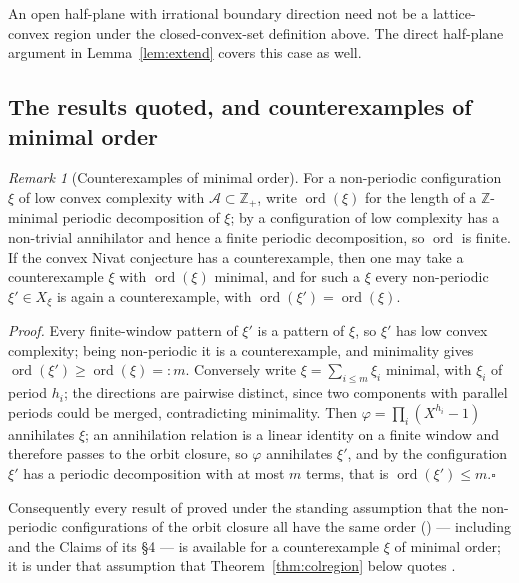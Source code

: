 \documentclass[11pt,reqno]{amsart}
\theoremstyle{plain}
\theoremstyle{definition}
\theoremstyle{remark}
\newtheorem{rem}[thm]{Remark}
\theoremstyle{plain}
\theoremstyle{remark}
\theoremstyle{definition}
\numberwithin{equation}{section}
\DeclareMathOperator{\ord}{ord}
\newcommand{\Z}{\mathbb{Z}}
\newcommand{\cA}{\mathcal{A}}
\begin{document}
An open half-plane with irrational boundary direction need not be a
lattice-convex region under the closed-convex-set definition above.  The direct
half-plane argument in Lemma~\ref{lem:extend} covers this case as well.

\subsection{The results quoted, and counterexamples of minimal
order}\label{ssec:external}

\begin{rem}[Counterexamples of minimal order]\label{rem:minimal}
For a non-periodic configuration $\xi$ of low convex complexity with
$\cA\subset\Z_+$, write $\ord(\xi)$ for the length of a $\Z$-minimal periodic
decomposition of $\xi$; by \cite{KS} a configuration of low complexity has a
non-trivial annihilator and hence a finite periodic decomposition, so $\ord$ is
finite.  If the convex Nivat conjecture has a counterexample, then one may take
a counterexample $\xi$ with $\ord(\xi)$ minimal, and for such a $\xi$ every
non-periodic $\xi'\in X_\xi$ is again a counterexample, with
$\ord(\xi')=\ord(\xi)$.

\emph{Proof.}  Every finite-window pattern of $\xi'$ is a pattern of $\xi$, so
$\xi'$ has low convex complexity; being non-periodic it is a counterexample, and
minimality gives $\ord(\xi')\ge\ord(\xi)=:m$.  Conversely write
$\xi=\sum_{i\le m}\xi_i$ minimal, with $\xi_i$ of period $h_i$; the directions
are pairwise distinct, since two components with parallel periods could be
merged, contradicting minimality.  Then $\varphi=\prod_i(X^{h_i}-1)$ annihilates
$\xi$; an annihilation relation is a linear identity on a finite window and
therefore passes to the orbit closure, so $\varphi$ annihilates $\xi'$, and by
\cite{KS} the configuration $\xi'$ has a periodic decomposition with at most $m$
terms, that is $\ord(\xi')\le m$.\hfill$\square$
\end{rem}

Consequently every result of \cite{Colle23a} proved under the standing
assumption that the non-periodic configurations of the orbit closure all have
the same order (\cite[\S4.1]{Colle23a}) — including
\cite[Theorem~1.10]{Colle23a} and the Claims of its
\S4 — is available for a counterexample $\xi$ of minimal order; it is under that
assumption that Theorem~\ref{thm:colregion} below quotes
\cite[Lemma~4.6]{Colle23a}.
\end{document}
